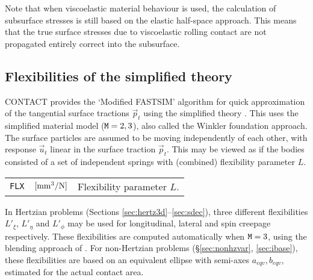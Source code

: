 \documentclass[12pt]{report}
\renewcommand{\magenta}[1]{}
\newenvironment{inputvars}{\vspace{0.4\baselineskip}%

\begin{tabular}{>{\raggedright}p{22mm}p{19mm}p{113mm}}}{
\end{tabular}

}
\newcommand{\inpvar}[3]{{\small\tt #1} & $#2$ & #3 \\[1ex]}
\begin{document}
Note that when viscoelastic material behaviour is used, the calculation of
subsurface stresses is still based on the elastic half-space approach. This
means that the true surface stresses due to viscoelastic rolling contact
are not propagated entirely correct into the subsurface.

\magenta{
\subsection{\texorpdfstring{\magenta{Compressible elastic layer}}{Compressible elastic layer}}
\label{sec:thin_sheet}

A quick fix is made to capture the effect of a sheet of pressure sensitive
paper, using the normal part of Kalker's first order theory \cite[\S
3.2]{Kalker1990}:
\begin{equation}
     u_z^{(3)} = L_z p_n, \;\; 
     L_z = h^{(3)} \frac{(1+\nu^{(3)}) (1-2\nu^{(3)})}{(1-\nu^{(3)}) E^{(3)}} .
\end{equation} 
\begin{inputvars}
\inpvar{FLXZ}{\bunit{mm^3/N}}{Flexibility parameter $L_z$.}
\end{inputvars}
This option is activated with ${\tt B}=1$ (page \pageref{b-digit}).
}

\subsection{Flexibilities of the simplified theory}
\label{sec:fastsim}

CONTACT provides the `Modified FASTSIM' algorithm \cite{Spiryagin2013} for
quick approximation of the tangential surface tractions $\vec{p}_t$ using
the simplified theory \cite{Kalker1973,Kalker1982a-fastsim}. This uses the
simplified material model (${\tt M}=2,3$), also called the Winkler
foundation approach. The surface particles are assumed to be moving
independently of each other, with response $\vec{u}_t$ linear in the
surface traction $\vec{p}_t$. This may be viewed as if the bodies
consisted of a set of independent springs with (combined) flexibility
parameter $L$.
\begin{inputvars}
\inpvar{FLX}{\bunit{mm^3/N}}{Flexibility parameter $L$.}
\end{inputvars}
In Hertzian problems (Sections \ref{sec:hertz3d}--\ref{sec:sdec}),
three different flexibilities $L'_\xi$, $L'_\eta$ and $L'_\phi$ may be
used for longitudinal, lateral and spin creepage respectively. These
flexibilities are computed automatically when ${\tt M}=3$, using the
blending approach of \cite{Vollebregt2022a-1flex}. For non-Hertzian
problems (\S \ref{sec:nonhzvar}, \ref{sec:ibase}), these flexibilities
are based on an equivalent ellipse with semi-axes $a_{eqv}, b_{eqv}$,
estimated for the actual contact area.
\end{document}

